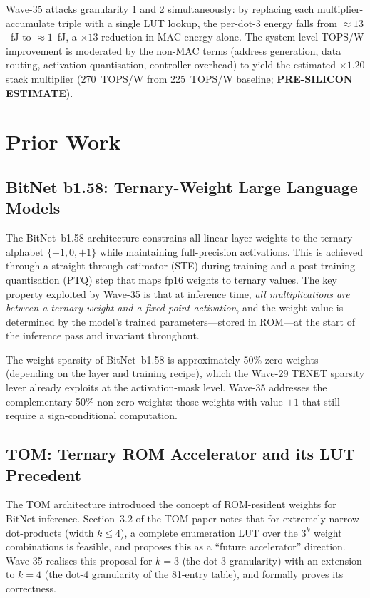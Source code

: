 Wave-35 attacks granularity 1 and 2 simultaneously: by replacing each
multiplier-accumulate triple with a single LUT lookup, the per-dot-3 energy
falls from $\approx 13$~fJ to $\approx 1$~fJ, a $\times 13$ reduction in MAC
energy alone.  The system-level TOPS/W improvement is moderated by the
non-MAC terms (address generation, data routing, activation quantisation,
controller overhead) to yield the estimated $\times 1.20$ stack multiplier
(270~TOPS/W from 225~TOPS/W baseline; \textbf{PRE-SILICON ESTIMATE}).

\section{Prior Work}
\label{sec:prior_work}

\subsection{BitNet b1.58: Ternary-Weight Large Language Models}

The BitNet~b1.58 architecture \cite{bitnet_b158_2024} constrains all linear
layer weights to the ternary alphabet $\{-1, 0, +1\}$ while maintaining
full-precision activations.  This is achieved through a straight-through
estimator (STE) during training and a post-training quantisation (PTQ) step
that maps fp16 weights to ternary values.  The key property exploited by
Wave-35 is that at inference time, \emph{all multiplications are between a
ternary weight and a fixed-point activation}, and the weight value is determined
by the model's trained parameters---stored in ROM---at the start of the
inference pass and invariant throughout.

The weight sparsity of BitNet~b1.58 is approximately 50\% zero weights
(depending on the layer and training recipe), which the Wave-29 TENET sparsity
lever \cite{glava79_tenet_sparsity} already exploits at the activation-mask
level.  Wave-35 addresses the complementary 50\% non-zero weights: those
weights with value $\pm 1$ that still require a sign-conditional computation.

\subsection{TOM: Ternary ROM Accelerator and its LUT Precedent}

The TOM architecture \cite{tom_arxiv_2602} introduced the concept of ROM-resident
weights for BitNet inference.  Section~3.2 of the TOM paper notes that for
extremely narrow dot-products (width $k \leq 4$), a complete enumeration LUT
over the $3^k$ weight combinations is feasible, and proposes this as a
``future accelerator'' direction.  Wave-35 realises this proposal for $k = 3$
(the dot-3 granularity) with an extension to $k = 4$ (the dot-4 granularity
of the 81-entry table), and formally proves its correctness.

